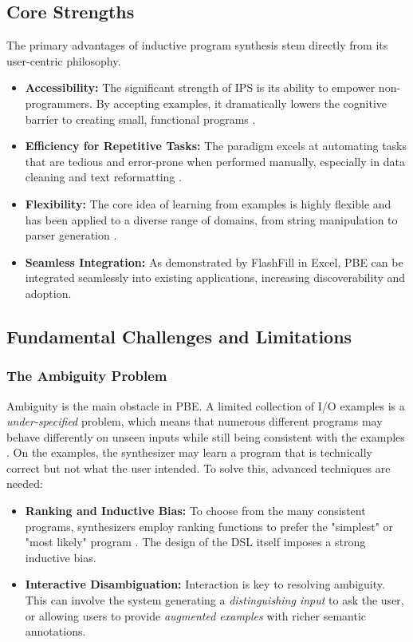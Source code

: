 \documentclass[12pt, a4paper]{report}
\begin{document}
\subsection{Core Strengths}

The primary advantages of inductive program synthesis stem directly from its user-centric philosophy.

\begin{itemize}
    \item \textbf{Accessibility:} The significant strength of IPS is its ability to empower non-programmers. By accepting examples, it dramatically lowers the cognitive barrier to creating small, functional programs \citep{gulwani2012dimensions}.
    \item \textbf{Efficiency for Repetitive Tasks:} The paradigm excels at automating tasks that are tedious and error-prone when performed manually, especially in data cleaning and text reformatting \citep{gulwani2017program}.
    \item \textbf{Flexibility:} The core idea of learning from examples is highly flexible and has been applied to a diverse range of domains, from string manipulation to parser generation \citep{gulwani2017program}.
    \item \textbf{Seamless Integration:} As demonstrated by FlashFill in Excel, PBE can be integrated seamlessly into existing applications, increasing discoverability and adoption.
\end{itemize}

\subsection{Fundamental Challenges and Limitations}

\subsubsection{The Ambiguity Problem}

Ambiguity is the main obstacle in PBE. A limited collection of I/O examples is a \textit{under-specified} problem, which means that numerous different programs may behave differently on unseen inputs while still being consistent with the examples \citep{summers1977methodology, lee2024code}. On the examples, the synthesizer may learn a program that is technically correct but not what the user intended. To solve this, advanced techniques are needed:

\begin{itemize}
    \item \textbf{Ranking and Inductive Bias:} To choose from the many consistent programs, synthesizers employ ranking functions to prefer the "simplest" or "most likely" program \citep{summers1977methodology}. The design of the DSL itself imposes a strong inductive bias.
    \item \textbf{Interactive Disambiguation:} Interaction is key to resolving ambiguity. This can involve the system generating a \textit{distinguishing input} to ask the user, or allowing users to provide \textit{augmented examples} with richer semantic annotations.
\end{itemize}
\end{document}
